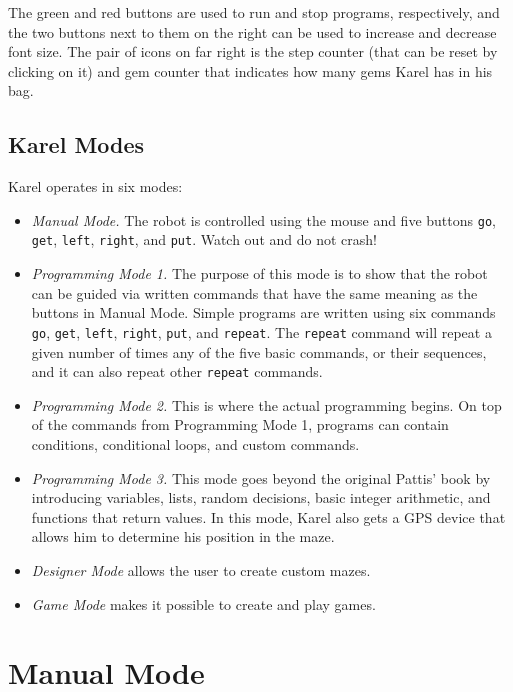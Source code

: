 The green and red 
buttons are used to run and stop programs, respectively, and the two buttons next to them on
the right can be used to increase and decrease font size. The pair of icons on far right is the 
step counter (that can be reset by clicking on it) and gem counter that indicates how many gems 
Karel has in his bag.

\subsection{Karel Modes} \label{modes}

Karel operates in six modes:
\begin{itemize}
\item {\em Manual Mode.} The robot is controlled using the mouse and five buttons 
      {\tt go}, {\tt get}, {\tt left}, {\tt right}, and {\tt put}. 
      Watch out and do not crash!
\item {\em Programming Mode 1.} The purpose of this mode is to show that the robot 
      can be guided via written commands that have the same meaning as the buttons 
      in Manual Mode. Simple programs are written using 
      six commands {\tt go}, {\tt get}, {\tt left}, {\tt right}, {\tt put}, and {\tt repeat}. 
      The {\tt repeat} command will repeat a given number of times 
      any of the five basic commands, or their sequences, and it can also repeat other {\tt repeat} commands. 
\item {\em Programming Mode 2.} This is where the actual programming begins. On top of the commands 
      from Programming Mode 1, programs can contain conditions, conditional loops, and custom commands.
\item {\em Programming Mode 3.} This mode goes beyond the original Pattis' book by introducing variables, 
      lists, random decisions, basic integer arithmetic, and functions that 
      return values. In this mode, Karel also gets a GPS device that allows him to determine his position 
      in the maze. 
\item {\em Designer Mode} allows the user to create custom mazes.
\item {\em Game Mode} makes it possible to create and play games. 
\end{itemize}


\section{Manual Mode} \label{sec:manual}

